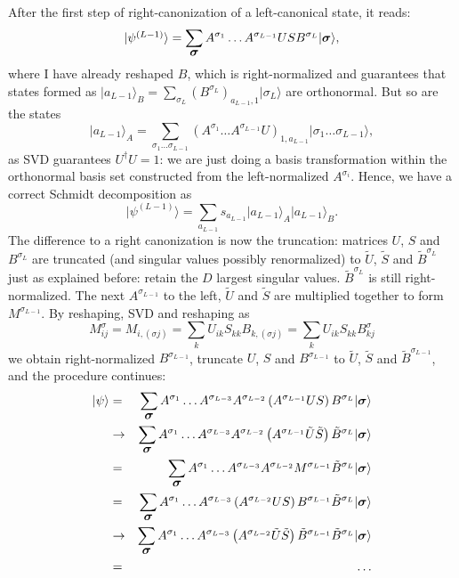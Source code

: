 \documentclass[a4paper,10pt,oneside,onecolumn,1p,times]{elsarticle}
\newcommand{\ket}[1]{\mbox{$| #1  \rangle$}}
\newcommand{\fat}[1]{\mbox{\boldmath$#1$\unboldmath}}	%
\begin{document}
After the first step of right-canonization of a left-canonical state, it reads:
\begin{equation}
\ket{\psi^{(L-1)}} = \sum_{\fat{\sigma}} A^{\sigma_1} \ldots A^{\sigma_{L-1}} U S B^{\sigma_L} \ket{\fat{\sigma}} ,
\end{equation}
where I have already reshaped $B$, which is right-normalized and guarantees that states formed as $\ket{a_{L-1}}_B = \sum_{\sigma_L} (B^{\sigma_L})_{a_{L-1},1} \ket{\sigma_L}$ are orthonormal. But so are the states 
\begin{equation}
\ket{a_{L-1}}_A = \sum_{\sigma_1 \ldots \sigma_{L-1}} (A^{\sigma_1} \ldots A^{\sigma_{L-1}} U)_{1,a_{L-1}} \ket{\sigma_1 \ldots \sigma_{L-1}},
\end{equation}
as SVD guarantees $U^\dagger U = 1$: we are just doing a basis transformation within the orthonormal basis set constructed from the left-normalized $A^{\sigma_i}$. Hence, we have a correct Schmidt decomposition as
\begin{equation}
\ket{\psi^{(L-1)}} = \sum_{a_{L-1}} s_{a_{L-1}} \ket{a_{L-1}}_A \ket{a_{L-1}}_B .
\end{equation}
The difference to a right canonization is now the truncation: matrices $U$, $S$ and $B^{\sigma_L}$ are truncated (and singular values possibly renormalized) to $\tilde{U}$, $\tilde{S}$ and $\tilde{B}^{\sigma_L}$ just as explained before: retain the $D$ largest singular values. $\tilde{B}^{\sigma_L}$ is still right-normalized. The next $A^{\sigma_{L-1}}$ to the left, $\tilde{U}$ and $\tilde{S}$ are multiplied together to form $M^{\sigma_{L-1}}$. By reshaping, SVD and reshaping as 
\begin{equation}
M^{\sigma}_{ij} = M_{i, (\sigma j)} = \sum_k U_{ik} S_{kk} B_{k,(\sigma j)} = \sum_k U_{ik} S_{kk} B^{\sigma}_{kj} 
\end{equation} 
we obtain right-normalized $B^{\sigma_{L-1}}$, truncate $U$, $S$ and $B^{\sigma_{L-1}}$ to $\tilde{U}$, $\tilde{S}$ and $\tilde{B}^{\sigma_{L-1}}$, and the procedure continues:
\begin{eqnarray*}
\ket{\psi} &=& \sum_{\fat{\sigma}}  A^{\sigma_1} \ldots A^{\sigma_{L-3}}A^{\sigma_{L-2}} \left( A^{\sigma_{L-1}} U S \right)B^{\sigma_L}   \ket{\fat{\sigma}} \\
&\rightarrow& \sum_{\fat{\sigma}} A^{\sigma_1} \ldots A^{\sigma_{L-3}}A^{\sigma_{L-2}}\left( A^{\sigma_{L-1}} \tilde{U} \tilde{S} \right) \tilde{B}^{\sigma_L}   \ket{\fat{\sigma}} \\
&=&  \sum_{\fat{\sigma}} A^{\sigma_1} \ldots A^{\sigma_{L-3}}A^{\sigma_{L-2}} M^{\sigma_{L-1}} \tilde{B}^{\sigma_L}   \ket{\fat{\sigma}} \\
&=& \sum_{\fat{\sigma}} A^{\sigma_1} \ldots A^{\sigma_{L-3}} \left( A^{\sigma_{L-2}} U S \right) B^{\sigma_{L-1}} \tilde{B}^{\sigma_L}   \ket{\fat{\sigma}} \\
&\rightarrow& \sum_{\fat{\sigma}} A^{\sigma_1} \ldots A^{\sigma_{L-3}} \left( A^{\sigma_{L-2}} \tilde{U} \tilde{S} \right) \tilde{B}^{\sigma_{L-1}} \tilde{B}^{\sigma_L}   \ket{\fat{\sigma}} \\
&=& \ldots
\end{eqnarray*}
\end{document}
